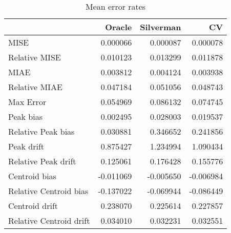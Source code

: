 \begin{table}[ht]
\centering
\begin{tabular}{lrrr}
  \hline
 & Oracle & Silverman & CV \\ 
  \hline
MISE & 0.000066 & 0.000087 & 0.000078 \\ 
  Relative MISE & 0.010123 & 0.013299 & 0.011878 \\ 
  MIAE & 0.003812 & 0.004124 & 0.003938 \\ 
  Relative MIAE & 0.047184 & 0.051056 & 0.048743 \\ 
  Max Error & 0.054969 & 0.086132 & 0.074745 \\ 
  Peak bias & 0.002495 & 0.028003 & 0.019537 \\ 
  Relative Peak bias & 0.030881 & 0.346652 & 0.241856 \\ 
  Peak drift & 0.875427 & 1.234994 & 1.090434 \\ 
  Relative Peak drift & 0.125061 & 0.176428 & 0.155776 \\ 
  Centroid bias & -0.011069 & -0.005650 & -0.006984 \\ 
  Relative Centroid bias & -0.137022 & -0.069944 & -0.086449 \\ 
  Centroid drift & 0.238070 & 0.225614 & 0.227857 \\ 
  Relative Centroid drift & 0.034010 & 0.032231 & 0.032551 \\ 
   \hline
\end{tabular}
\caption{Mean error rates} 
\label{tbl:mean_error_rates}
\end{table}
